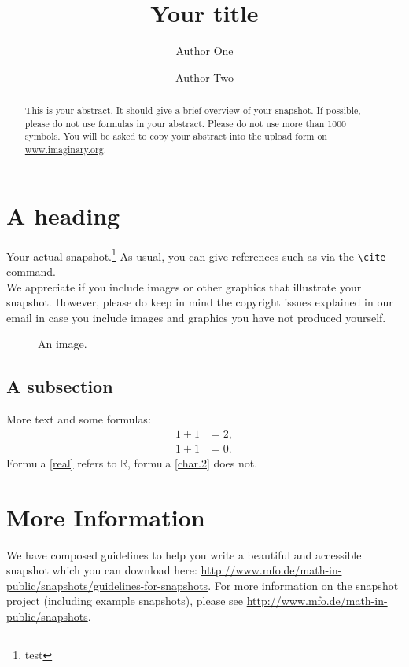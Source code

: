 \documentclass{snapshotmfo}
\author{Author One \and Author Two}
\title{Your title}
\begin{document}
\begin{abstract}
This is your abstract. It should give a brief overview of your snapshot. If possible, please do not use formulas in your abstract. Please do not use more than 1000 symbols. You will be asked to copy your abstract into the upload form on \url{www.imaginary.org}. 
\end{abstract}

\section{A heading}
Your actual snapshot.\footnote{test} As usual, you can give references such as \cite{snapshot,knuth1986texbook} via the \verb+\cite+ command.\\

We appreciate if you include images or other graphics that illustrate your snapshot. However, please do keep in mind the copyright issues explained in our email in case you include images and graphics you have not produced yourself.

\begin{figure}[h]
        \centering \setlength{\fboxsep}{1cm}
        \caption{An image.}
\label{fig:moon}
\end{figure}

\subsection{A subsection}
More text and some formulas:
\begin{align}\label{real}
1+1&=2,\\\label{char.2}
1+1&=0.
\end{align}
Formula \eqref{real} refers to $\mathbb{R}$, formula \eqref{char.2} does not.

\section{More Information}
We have composed guidelines to help you write a beautiful and accessible snapshot which you can download here: \url{http://www.mfo.de/math-in-public/snapshots/guidelines-for-snapshots}. For more information on the snapshot project (including example snapshots), please see \url{http://www.mfo.de/math-in-public/snapshots}.



%
\end{document}
